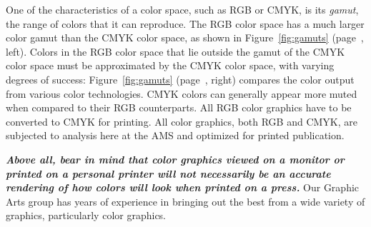 
One of the characteristics of a color space, such as RGB or CMYK, is
its \emph{gamut}, the range of colors that it can reproduce. The RGB
color space has a much larger color gamut than the CMYK color space,
as shown in Figure~\ref{fig:gamuts} (page~\pageref{fig:gamuts}, left).
Colors in the RGB color space that lie outside the gamut of the CMYK
color space must be approximated by the CMYK color space, with varying
degrees of success: Figure~\ref{fig:gamuts} (page~\pageref{fig:gamuts},
right) compares the color output from various color technologies. CMYK
colors can generally appear more muted when compared to their RGB
counterparts. All RGB color graphics have to be converted to CMYK for
printing. All color graphics, both RGB and CMYK, are subjected to analysis
here at the AMS and optimized for printed publication.

\textbf{\emph{Above all, bear in mind that color graphics viewed on a
 monitor or printed on a personal printer will not necessarily be an
 accurate rendering of how colors will look when printed on a press.}}
 Our Graphic Arts group has years of experience in bringing out the best
 from a wide variety of graphics, particularly color graphics.

